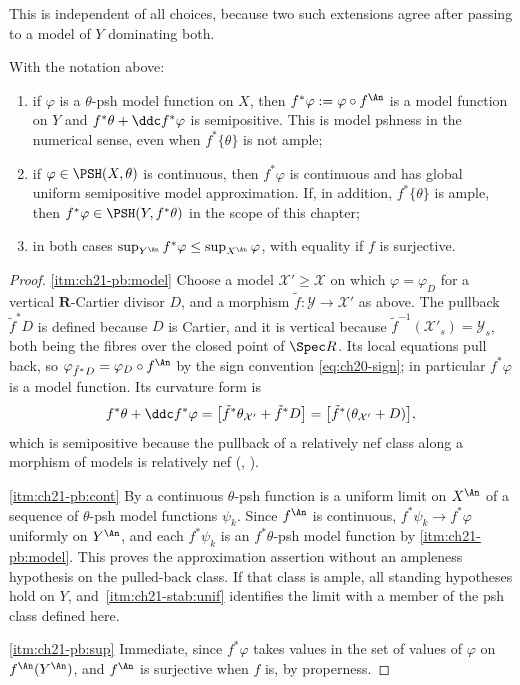 This is independent of all choices, because two such extensions agree after
passing to a model of $Y$ dominating both.

\begin{proposition}
\label{prop:ch21-pullback}
With the notation above:
\begin{enumerate}
\item\label{itm:ch21-pb:model}
if $\varphi$ is a $\theta$-psh model function on $X$, then
$f^*\varphi:=\varphi\circ f^{\An}$ is a model function on $Y$ and
$f^*\theta+\ddc f^*\varphi$ is semipositive.  This is model pshness in
the numerical sense, even when $f^*\{\theta\}$ is not ample;
\item\label{itm:ch21-pb:cont}
if $\varphi\in\PSH(X,\theta)$ is continuous, then $f^*\varphi$
is continuous and has global uniform semipositive model approximation.
If, in addition, $f^*\{\theta\}$ is ample, then
$f^*\varphi\in\PSH(Y,f^*\theta)$ in the scope of this chapter;
\item\label{itm:ch21-pb:sup}
in both cases $\sup_{Y^{\An}}f^*\varphi\leq\sup_{X^{\An}}\varphi$, with
equality if $f$ is surjective.
\end{enumerate}
\end{proposition}

\begin{proof}
\cref{itm:ch21-pb:model}  Choose a model $\mathcal X'\geq\mathcal X$ on
which $\varphi=\varphi_D$ for a vertical $\mathbf R$-Cartier divisor
$D$, and a morphism $\tilde f:\mathcal Y\to\mathcal X'$ as above.  The
pullback $\tilde f^*D$ is defined because $D$ is Cartier, and it is
vertical because $\tilde f^{-1}(\mathcal X'_s)=\mathcal Y_s$, both being
the fibres over the closed point of $\Spec R$.  Its local equations pull
back, so $\varphi_{\tilde f^*D}=\varphi_D\circ f^{\An}$ by the sign
convention \eqref{eq:ch20-sign}; in particular $f^*\varphi$ is a model
function.  Its curvature form is
\[
 f^*\theta+\ddc f^*\varphi
 =\bigl[\tilde f^*\theta_{\mathcal X'}+\tilde f^*D\bigr]
 =\bigl[\tilde f^*(\theta_{\mathcal X'}+D)\bigr],
\]
which is semipositive because the pullback of a relatively nef class along a
morphism of models is relatively nef
(, ).

\cref{itm:ch21-pb:cont}  By  a continuous
$\theta$-psh function is a uniform limit on $X^{\An}$ of a sequence of
$\theta$-psh model functions $\psi_k$.  Since $f^{\An}$ is continuous,
$f^*\psi_k\to f^*\varphi$ uniformly on $Y^{\An}$, and each
$f^*\psi_k$ is an $f^*\theta$-psh model function by
\cref{itm:ch21-pb:model}.  This proves the approximation assertion
without an ampleness hypothesis on the pulled-back class.  If that class
is ample, all standing hypotheses hold on $Y$, and
\,\cref{itm:ch21-stab:unif} identifies the
limit with a member of the psh class defined here.

\cref{itm:ch21-pb:sup}  Immediate, since $f^*\varphi$ takes values in the
set of values of $\varphi$ on $f^{\An}(Y^{\An})$, and $f^{\An}$ is
surjective when $f$ is, by properness.
\end{proof}

